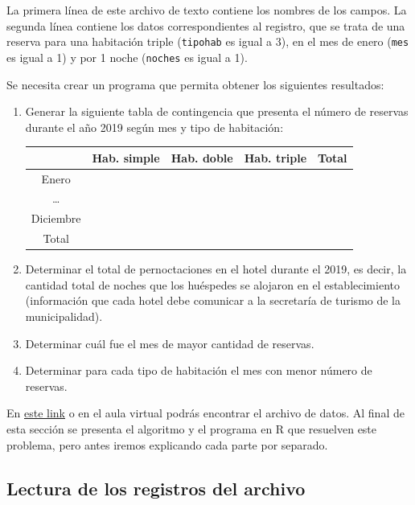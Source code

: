 \documentclass[
]{book}
\begin{document}
La primera línea de este archivo de texto contiene los nombres de los campos. La segunda línea contiene los datos correspondientes al registro, que se trata de una reserva para una habitación triple (\texttt{tipohab} es igual a 3), en el mes de enero (\texttt{mes} es igual a 1) y por 1 noche (\texttt{noches} es igual a 1).

Se necesita crear un programa que permita obtener los siguientes resultados:

\begin{enumerate}
\def\labelenumi{\alph{enumi})}
\item
  Generar la siguiente tabla de contingencia que presenta el número de reservas durante el año 2019 según mes y tipo de habitación:

  \begin{longtable}[]{@{}ccccc@{}}
  \toprule
  & Hab. simple & Hab. doble & Hab. triple & Total \\
  \midrule
  \endhead
  Enero & & & & \\
  \ldots{} & & & & \\
  Diciembre & & & & \\
  Total & & & & \\
  \bottomrule
  \end{longtable}
\item
  Determinar el total de pernoctaciones en el hotel durante el 2019, es decir, la cantidad total de noches que los huéspedes se alojaron en el establecimiento (información que cada hotel debe comunicar a la secretaría de turismo de la municipalidad).
\item
  Determinar cuál fue el mes de mayor cantidad de reservas.
\item
  Determinar para cada tipo de habitación el mes con menor número de reservas.
\end{enumerate}

En \href{https://github.com/mpru/introprog/tree/master/archivos}{este link} o en el aula virtual podrás encontrar el archivo de datos. Al final de esta sección se presenta el algoritmo y el programa en R que resuelven este problema, pero antes iremos explicando cada parte por separado.

\hypertarget{lectura-de-los-registros-del-archivo}{%
\subsection{Lectura de los registros del archivo}\label{lectura-de-los-registros-del-archivo}}
\end{document}
